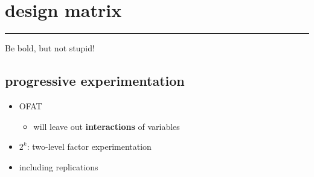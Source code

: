 \documentclass[
  a4paper,
]{scrbook}
\providecommand{\tightlist}{%
  \setlength{\itemsep}{0pt}\setlength{\parskip}{0pt}}\usepackage{longtable,booktabs,array}
\begin{document}
\section{design matrix}\label{design-matrix}

\begin{table}

\caption{\label{tbl-dm}The design matrix for the pizza dough
experimentation}


\end{table}%

\begin{center}\rule{0.5\linewidth}{0.5pt}\end{center}

Be bold, but not stupid!

\subsection{progressive
experimentation}\label{progressive-experimentation}

\begin{itemize}
\tightlist
\item
  OFAT

  \begin{itemize}
  \tightlist
  \item
    will leave out \textbf{interactions} of variables
  \end{itemize}
\item
  \(2^k\): two-level factor experimentation
\item
  including replications
\end{itemize}
\end{document}
